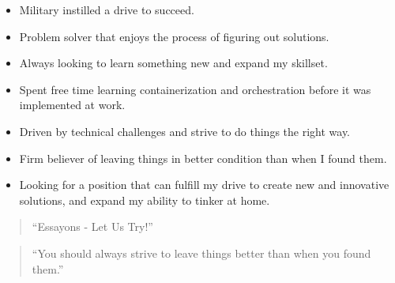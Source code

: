 \documentclass[10pt,a4paper,ragged2e,withhyper]{altacv}
\begin{document}
\begin{paracol}{2}
\medskip


\begin{itemize}
\item Military instilled a drive to succeed. 
\item Problem solver that enjoys the process of figuring out solutions. 
\item Always looking to learn something new and expand my skillset.
\item Spent free time learning containerization and orchestration before it was implemented at work.
\item Driven by technical challenges and strive to do things the right way. 
\item Firm believer of leaving things in better condition than when I found them. 
\item Looking for a position that can fulfill my drive to create new and innovative solutions, and expand my ability to tinker at home.
\end{itemize}

\switchcolumn


\begin{quote}
  ``Essayons - Let Us Try!''
  \end{quote}  

  \divider

\begin{quote}
``You should always strive to leave things better than when you found them.''
\end{quote}



\divider



\\

\divider\smallskip



\end{paracol}
\end{document}
